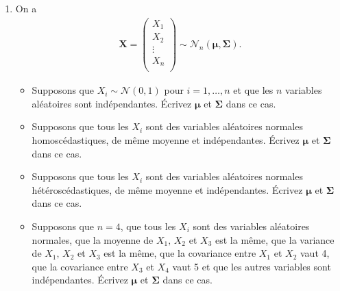 \documentclass[letter, 11pt]{article}
\newcommand{\N}{\mathcal{N}}
\newcommand{\bo}[1]{\boldsymbol#1}
\begin{document}
\begin{enumerate}[leftmargin=*, wide, label=\bf Exercice \arabic*:]
\item On a \begin{eqnarray*}
\bo{X} = \begin{pmatrix}
X_1 \\[4mm]
X_2 \\[4mm]
\vdots \\[4mm]
X_n \\[4mm]    
\end{pmatrix} \sim \N_n \left(\bo\mu, \bo\Sigma\right).
\end{eqnarray*}
\begin{itemize}
    \item[(a)] Supposons que $X_i \sim \N \left(0, 1\right)$ pour $i = 1, \dots, n$ et que les $n$ variables aléatoires sont indépendantes. Écrivez $\bo\mu$ et $\bo\Sigma$ dans ce cas.
    \item[(b)] Supposons que tous les $X_i$ sont des variables aléatoires normales homoscédastiques, de même moyenne et indépendantes. Écrivez $\bo\mu$ et $\bo\Sigma$ dans ce cas.
    \item[(c)] Supposons que tous les $X_i$ sont des variables aléatoires normales hétéroscédastiques, de même moyenne et indépendantes. Écrivez $\bo\mu$ et $\bo\Sigma$ dans ce cas.
    \item[(d)] Supposons que $n=4$, que tous les $X_i$ sont des variables aléatoires normales, que la moyenne de $X_1,\, X_2$ et $X_3$ est la même, que la variance de $X_1,\, X_2$ et $X_3$ est la même, que la covariance entre $X_1$ et $X_2$ vaut 4, que la covariance entre $X_3$ et $X_4$ vaut 5 et que les autres variables sont indépendantes. Écrivez $\bo\mu$ et $\bo\Sigma$ dans ce cas.\textbf{}
\end{itemize}


\end{enumerate}
\end{document}
